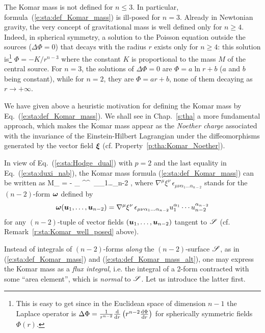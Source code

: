 \begin{remark}
The Komar mass is not defined for $n \leq 3$. In particular,
formula~(\ref{e:sta:def_Komar_mass}) is ill-posed for $n=3$.
Already in Newtonian gravity, the very concept of gravitational mass is well defined only
for $n \geq 4$. Indeed, in spherical symmetry,
a solution to the Poisson equation outside the sources ($\Delta \Phi = 0$)
that decays with the radius $r$ exists only for $n \geq 4$: this solution is\footnote{This is easy
to get since in the Euclidean space of dimension $n-1$ the Laplace
operator is $\Delta\Phi = \frac{1}{r^{n-2}} \frac{\mathrm{d} }{\mathrm{d} r} \left( r^{n-2} \frac{\mathrm{d} \Phi}{\mathrm{d} r} \right)$
for spherically symmetric fields $\Phi(r)$.}
$\Phi = - K/r^{n-3}$ where the constant $K$ is proportional to the mass $M$ of the central source.
For $n=3$, the solutions of $\Delta \Phi = 0$ are $\Phi = a \ln r + b$ ($a$ and $b$ being constant), while
for $n=2$, they are $\Phi = a r + b$, none of them decaying as $r\to +\infty$.
\end{remark}

\begin{remark} \label{r:sta:Komar_mass_as_Noether_charge}
We have given above a heuristic motivation for defining
the Komar mass by Eq.~(\ref{e:sta:def_Komar_mass}). We shall see in Chap.~\ref{s:tha}
a more fundamental approach, which makes the Komar mass appear as the \emph{Noether charge} associated
with the invariance of the Einstein-Hilbert Lagrangian
under the diffeomorphisms generated by the vector field $\bm{\xi}$ (cf. Property~\ref{p:tha:Komar_Noether}).
\end{remark}

In view of Eq.~(\ref{e:sta:Hodge_dual}) with $p=2$ and the last equality in Eq.~(\ref{e:sta:duxi_nab}),
the Komar mass formula (\ref{e:sta:def_Komar_mass}) can be written as
\be \label{e:sta:def_Komar_mass_alt}
    M_{\Sp} = -   \int_{\Sp}  \nabla^\mu \xi^\nu \,
    \epsilon_{\mu\nu\alpha_1\ldots\alpha_{n-2}} ,
\ee
where $\nabla^\mu \xi^\nu \, \epsilon_{\mu\nu\alpha_1\ldots\alpha_{n-2}}$
stands for the $(n-2)$-form $\bm{\omega}$ defined by
\[
  \bm{\omega}(\bm{u}_1,\ldots,\bm{u}_{n-2}) = \nabla^\mu \xi^\nu \,
\epsilon_{\mu\nu\alpha_1\ldots\alpha_{n-2}} u_1^{\alpha_1} \cdots  u_{n-2}^{\alpha_{n-2}}
\]
for any $(n-2)$-tuple of vector fields $(\bm{u}_1,\ldots,\bm{u}_{n-2})$ tangent to $\mathscr{S}$ (cf. Remark~\ref{r:sta:Komar_well_posed} above).

Instead of integrals of $(n-2)$-forms \emph{along} the $(n-2)$-surface $\mathscr{S}$, as in (\ref{e:sta:def_Komar_mass})
and (\ref{e:sta:def_Komar_mass_alt}), one may
express the Komar mass as a \emph{flux integral}, i.e. the integral of a 2-form
contracted with some ``area element'', which is \emph{normal} to $\mathscr{S}$.
Let us introduce the latter first.

